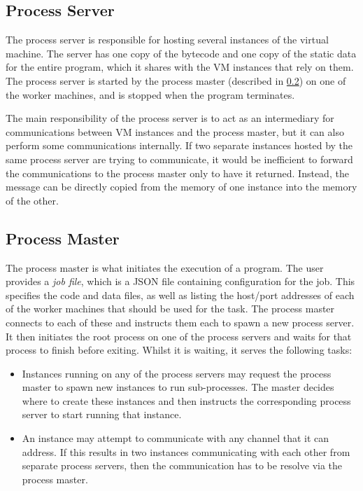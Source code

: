 \subsection{Process Server}

The process server is responsible for hosting several instances of the virtual
machine. The server has one copy of the bytecode and one copy of the static data
for the entire program, which it shares with the VM instances that rely on them.
The process server is started by the process master (described in
\ref{process-master}) on one of the worker machines, and is stopped when the
program terminates.

The main responsibility of the process server is to act as an intermediary for
communications between VM instances and the process master, but it can also
perform some communications internally. If two separate instances hosted by the
same process server are trying to communicate, it would be inefficient to
forward the communications to the process master only to have it returned.
Instead, the message can be directly copied from the memory of one instance into
the memory of the other.

\subsection{Process Master} \label{process-master}

The process master is what initiates the execution of a program. The user
provides a \textit{job file}, which is a JSON file containing configuration for
the job. This specifies the code and data files, as well as listing the
host/port addresses of each of the worker machines that should be used for the
task. The process master connects to each of these and instructs them each to
spawn a new process server. It then initiates the root process on one of the
process servers and waits for that process to finish before exiting. Whilst it
is waiting, it serves the following tasks:

\begin{itemize}
  \item
    Instances running on any of the process servers may request the process
    master to spawn new instances to run sub-processes. The master decides where
    to create these instances and then instructs the corresponding process
    server to start running that instance.
  \item
    An instance may attempt to communicate with any channel that it can address.
    If this results in two instances communicating with each other from separate
    process servers, then the communication has to be resolve via the process
    master.
\end{itemize}

